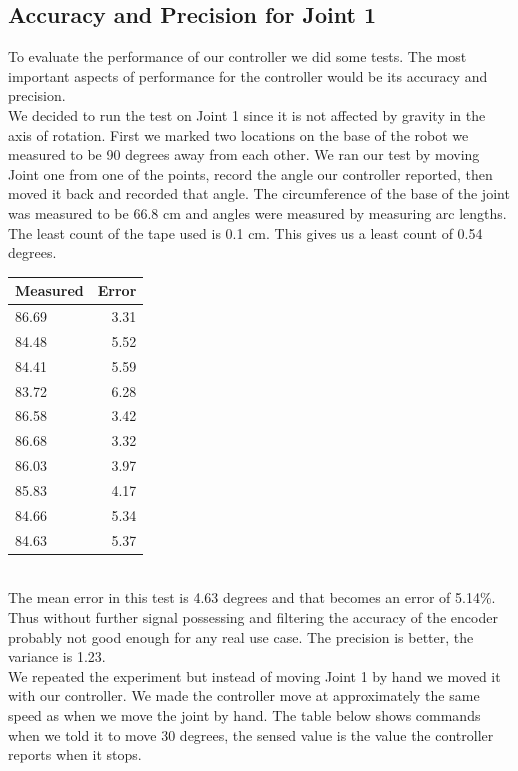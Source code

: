 \documentclass[10pt,a4paper]{article}
\begin{document}
\subsection{Accuracy and Precision for Joint 1}
To evaluate the performance of our controller we did some tests. The most important aspects of performance for the controller would be its accuracy and precision. \\

We decided to run the test on Joint 1 since it is not affected by gravity in the axis of rotation. First we marked two locations on the base of the robot we measured to be 90 degrees away from each other.  We ran our test by moving Joint one from one of the points, record the angle our controller reported, then moved it back and recorded that angle. The circumference of the base of the joint was measured to be 66.8 cm and angles were measured by measuring arc lengths. The least count of the tape used is 0.1 cm. This gives us a least count of 0.54 degrees.\\

\begin{tabular}{ | l | r |}
\hline
\textbf{Measured} & \textbf{Error} \\
\hline
 86.69 & 3.31 \\
\hline
 84.48 & 5.52 \\
\hline
 84.41 & 5.59 \\
\hline
 83.72 & 6.28 \\
\hline
 86.58 & 3.42\\
\hline
 86.68 & 3.32\\
\hline
86.03 & 3.97\\
\hline
85.83 & 4.17\\
\hline
84.66 & 5.34\\
\hline
84.63 & 5.37\\
\hline
\end{tabular} \\ 

The mean error in this test is 4.63 degrees and that becomes an error of 5.14\%. Thus without further signal possessing and filtering the accuracy of the encoder probably not good enough for any real use case. The precision is better, the variance is 1.23.\\

We repeated the experiment but instead of moving Joint 1 by hand we moved it with our controller. We made the controller move at approximately the same speed as when we move the joint by hand. The table below shows commands when we told it to move 30 degrees, the sensed value is the value the controller reports when it stops. \\
\end{document}
